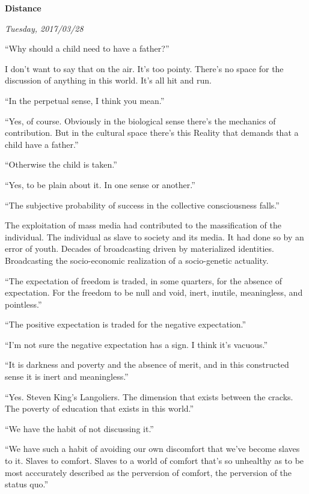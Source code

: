 

\centerline{\bf Distance}
\centerline{\it Tuesday, 2017/03/28}



\vfill
\break

﻿``Why should a child need to have a father?''

I don't want to say that on the air.  It's too pointy.  There's no
space for the discussion of anything in this world.  It's all hit and
run.

``In the perpetual sense, I think you mean.''

``Yes, of course.  Obviously in the biological sense there's the
mechanics of contribution.  But in the cultural space there's this
Reality that demands that a child have a father.''

``Otherwise the child is taken.''

``Yes, to be plain about it.  In one sense or another.''

``The subjective probability of success in the collective
consciousness falls.''

The exploitation of mass media had contributed to the massification of
the individual.  The individual as slave to society and its media.  It
had done so by an error of youth.  Decades of broadcasting driven by
materialized identities.  Broadcasting the socio-economic realization
of a socio-genetic actuality.

\vfill
\break

``The expectation of freedom is traded, in some quarters, for the
absence of expectation.  For the freedom to be null and void, inert,
inutile, meaningless, and pointless.''

``The positive expectation is traded for the negative expectation.''

``I'm not sure the negative expectation has a sign.  I think it's
vacuous.''

``It is darkness and poverty and the absence of \break merit, and in this
constructed sense it is inert and meaningless.''

``Yes.  Steven King's Langoliers.  The dimension that exists between
the cracks.  The poverty of education that exists in this world.''



\vfill
\break

``We have the habit of not discussing it.''

``We have such a habit of avoiding our own discomfort that we've
become slaves to it.  Slaves to comfort.  Slaves to a world of comfort
that's so unhealthy as to be most acccurately described as the
perversion of comfort, the perversion of the status quo.''

